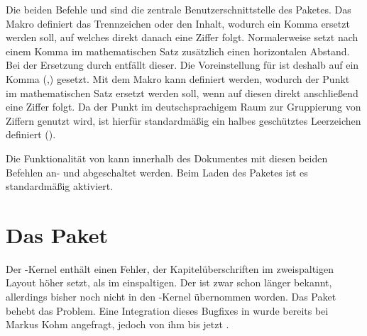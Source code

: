\begin{Declaration*}{}
\begin{Declaration}{}
\begin{Declaration}{}
\printdeclarationlist%
%
Die beiden Befehle  und  sind die zentrale 
Benutzerschnittstelle des Paketes. Das Makro  definiert das 
Trennzeichen oder den Inhalt, wodurch ein Komma ersetzt werden soll, auf 
welches direkt danach eine Ziffer folgt. Normalerweise setzt 
nach einem Komma im mathematischen Satz zusätzlich einen horizontalen Abstand.
Bei der Ersetzung durch  entfällt dieser. Die Voreinstellung
für  ist deshalb auf ein Komma (,) gesetzt. Mit dem Makro 
 kann definiert werden, wodurch der Punkt im mathematischen 
Satz ersetzt werden soll, wenn auf diesen direkt anschließend eine Ziffer 
folgt. Da der Punkt im deutschsprachigem Raum zur Gruppierung von Ziffern 
genutzt wird, ist hierfür standardmäßig ein halbes geschütztes Leerzeichen 
definiert (\Macro*{,}).
\end{Declaration}
\end{Declaration}
\begin{Declaration}[v2.02]{}
\begin{Declaration}[v2.02]{}
\printdeclarationlist%
%
%
Die Funktionalität von  kann innerhalb des Dokumentes mit 
diesen beiden Befehlen an- und abgeschaltet werden. Beim Laden des Paketes ist 
es standardmäßig aktiviert.
\end{Declaration}
\end{Declaration}
\end{Declaration*}



\section{Das Paket }
\begin{Declaration*}{}
%
%
Der -Kernel enthält einen Fehler, der Kapitelüberschriften im
zweispaltigen Layout höher setzt, als im einspaltigen. Der 
ist zwar schon länger bekannt, allerdings bisher noch nicht in den 
-Kernel übernommen worden. Das Paket  behebt 
das Problem. Eine Integration dieses Bugfixes in \KOMAScript{} wurde bereits 
bei Markus Kohm angefragt, jedoch von ihm bis jetzt 
.
\end{Declaration*}


